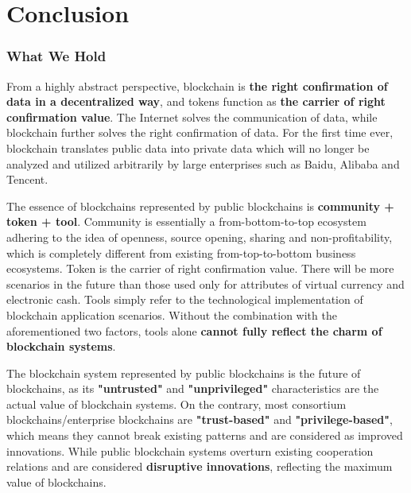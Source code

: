 \section{Conclusion}
\label{sec:conclusion}

\subsubsection*{What We Hold}

From a highly abstract perspective, blockchain is \textbf{the right confirmation of data in a decentralized way}, and tokens function as \textbf{the carrier of right confirmation value}. The Internet solves the communication of data, while blockchain further solves the right confirmation of data. For the first time ever, blockchain translates public data into private data which will no longer be analyzed and utilized arbitrarily by large enterprises such as Baidu, Alibaba and Tencent.


The essence of blockchains represented by public blockchains is \textbf{community + token + tool}. Community is essentially a from-bottom-to-top ecosystem adhering to the idea of openness, source opening, sharing and non-profitability, which is completely different from existing from-top-to-bottom business ecosystems. Token is the carrier of right confirmation value. There will be more scenarios in the future than those used only for attributes of virtual currency and electronic cash. Tools simply refer to the technological implementation of blockchain application scenarios. Without the combination with the aforementioned two factors, tools alone \textbf{cannot fully reflect the charm of blockchain systems}.


The blockchain system represented by public blockchains is the future of blockchains, as its \textbf{"untrusted"} and \textbf{"unprivileged"} characteristics are the actual value of blockchain systems. On the contrary, most consortium blockchains/enterprise blockchains are \textbf{"trust-based"} and \textbf{"privilege-based"}, which means they cannot break existing patterns and are considered as improved innovations. While public blockchain systems overturn existing cooperation relations and are considered \textbf{disruptive innovations}, reflecting the maximum value of blockchains.

